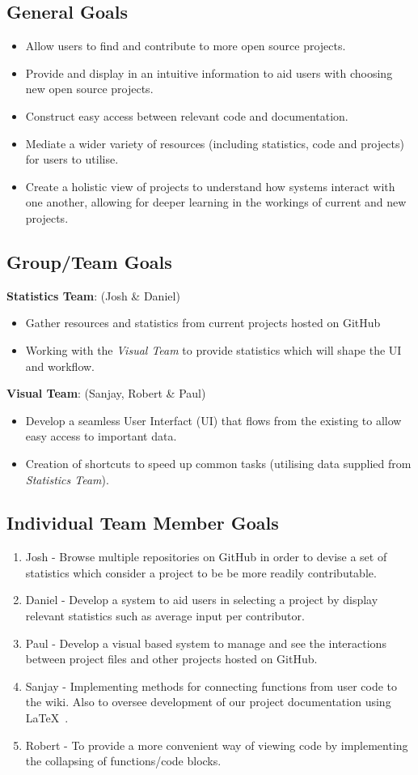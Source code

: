 \documentclass[12pt]{article}
\begin{document}
\subsection{General Goals}
\begin{itemize}
\item Allow users to find and contribute to more open source projects.
\item Provide and display in an intuitive information to aid users with choosing new open source projects.
\item Construct easy access between relevant code and documentation.
\item Mediate a wider variety of resources (including statistics, code and projects) for users to utilise.
\item Create a holistic view of projects to understand how systems interact with one another, allowing for deeper learning in the workings of current and new projects.
\end{itemize}
\subsection{Group/Team Goals}
\textbf{Statistics Team}: (Josh \& Daniel)
\begin{itemize}
\item Gather resources and statistics from current projects hosted on GitHub
\item Working with the \emph{Visual Team} to provide statistics which will shape the UI and workflow.
\end{itemize}
\textbf{Visual Team}: (Sanjay, Robert \& Paul)
\begin{itemize}
\item Develop a seamless User Interfact (UI) that flows from the existing to allow easy access to important data.
\item Creation of shortcuts to speed up common tasks (utilising data supplied from \emph{Statistics Team}).
\end{itemize}
\subsection{Individual Team Member Goals}
\begin{enumerate}
\item Josh - Browse multiple repositories on \textsf{GitHub} in order to devise a set of statistics which consider a project to be be more readily contributable.
\item Daniel - Develop a system to aid users in selecting a project by display relevant statistics such as average input per contributor.  
\item Paul - Develop a visual based system to manage and see the interactions between project files and other projects hosted on \textsf{GitHub}.
\item Sanjay - Implementing methods for connecting functions from user code to the wiki. Also to oversee development of our project documentation using \LaTeX\ .
\item Robert - To provide a more convenient way of viewing code by implementing the collapsing of functions/code blocks.
\end{enumerate}
\end{document}
